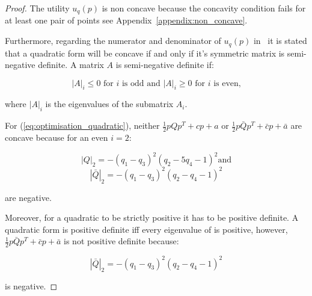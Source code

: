 \begin{proof}

The utility \(u_q(p)\) is non concave because the concavity condition fails for at
least one pair of points see Appendix~\ref{appendix:non_concave}.

Furthermore, regarding the numerator and denominator of \(u_q(p)\)
in~\cite{Anton2014} it is stated that a quadratic form will be concave if and
only if it's symmetric matrix is semi-negative definite. A matrix \(A\) is
semi-negative definite if:

\begin{equation}\label{def:semi_negative}
|A|_i \leq 0 \text{ for } i \text{ is odd and } |A|_i \geq 0  \text{ for } i
\text{ is even,}
\end{equation}

where \(|A|_i\) is the eigenvalues of the submatrix \(A_i\).

For (\ref{eq:optimisation_quadratic}), neither \(\frac{1}{2}pQp^T + cp + a\)
or \(\frac{1}{2}p\bar{Q}p^T + \bar{c}p + \bar{a}\) are concave because for an even \(i=2\):

\[|Q|_2 = - \left(q_{1} - q_{3}\right)^{2} \left(q_{2} - 5 q_{4} - 1\right)^{2} \text{and}\]
\[|\bar{Q}|_2 =- \left(q_{1} - q_{3}\right)^{2} \left(q_{2} - q_{4} - 1\right)^{2}\]

are negative.

Moreover, for a quadratic to be strictly positive it has to be positive definite.
A quadratic form is positive definite iff every eigenvalue of is positive,
however, \(\frac{1}{2}p\bar{Q}p^T + \bar{c}p + \bar{a}\) is not positive definite
because:

\[|\bar{Q}|_2 =- \left(q_{1} - q_{3}\right)^{2} \left(q_{2} - q_{4} - 1\right)^{2}\]

is negative.
\end{proof}